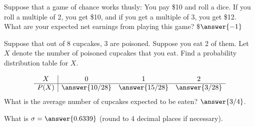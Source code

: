\documentclass{ximera}
\begin{document}
\begin{problem}
Suppose that a game of chance works thusly:  You pay \$10 and roll a dice.  If you roll a multiple of 2, you get \$10, and if you get a multiple of 3, you get \$12.  What are your expected net earnings from playing this game? \$$\answer{-1}$
\end{problem}


\begin{problem}
Suppose that out of 8 cupcakes, 3 are poisoned.  Suppose you eat 2 of them. Let $X$ denote the number of poisoned cupcakes that you eat.  Find a probability distribution table for $X$.

$$
\begin{array}{c|ccc}
X&0&1&2\\
\hline
P(X)&\answer{10/28}&\answer{15/28} &\answer{3/28}
\end{array}
$$
What is the average number of cupcakes expected to be eaten? $\answer{3/4}$.

What is $\sigma=\answer{0.6339}$ (round to 4 decimal places if necessary).

\end{problem}
\end{document}
